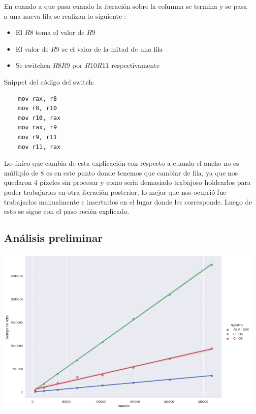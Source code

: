 En cuando a que pasa cuando la iteración sobre la columna se termina y se pasa a una nueva fila se realizan lo siguiente :
\begin{itemize}

\item El $R8$ toma el valor de $R9$

\item El valor de $R9$ se el valor de la mitad de una fila 

\item Se switchea $R8 R9$ por $R10 R11$ respectivamente
\end{itemize}

Snippet del código del switch:

\begin{lstlisting}
	mov rax, r8
	mov r8, r10
	mov r10, rax
	mov rax, r9
	mov r9, r11
	mov r11, rax
\end{lstlisting}

Lo único que cambia de esta explicación con respecto a cuando el ancho no es múltiplo de 8 es en este punto donde tenemos que cambiar de fila, ya que nos quedaron 4 pixeles sin procesar y como seria demasiado trabajoso holdearlos para poder trabajarlos en otra iteración posterior, lo mejor que nos ocurrió fue trabajarlos manualmente e insertarlos en el lugar donde les corresponde. Luego de esto se sigue con el paso recién explicado.


\subsection{Análisis preliminar}

\begin{center}
	\includegraphics[scale=0.5]{img/fourCombine_CvsASMvsO3.png}
\end{center}


